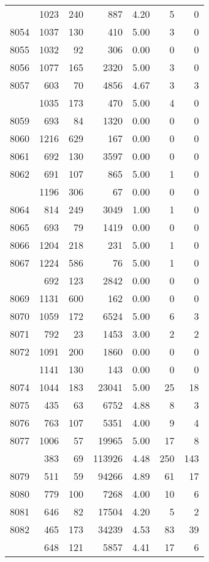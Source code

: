 \documentclass[
]{article}
\begin{document}
\begin{table}
\begin{tabular}[t]{lrrrrrr}
\addlinespace
8053 & 1023 & 240 & 887 & 4.20 & 5 & 0\\
8054 & 1037 & 130 & 410 & 5.00 & 3 & 0\\
8055 & 1032 & 92 & 306 & 0.00 & 0 & 0\\
8056 & 1077 & 165 & 2320 & 5.00 & 3 & 0\\
8057 & 603 & 70 & 4856 & 4.67 & 3 & 3\\
\addlinespace
8058 & 1035 & 173 & 470 & 5.00 & 4 & 0\\
8059 & 693 & 84 & 1320 & 0.00 & 0 & 0\\
8060 & 1216 & 629 & 167 & 0.00 & 0 & 0\\
8061 & 692 & 130 & 3597 & 0.00 & 0 & 0\\
8062 & 691 & 107 & 865 & 5.00 & 1 & 0\\
\addlinespace
8063 & 1196 & 306 & 67 & 0.00 & 0 & 0\\
8064 & 814 & 249 & 3049 & 1.00 & 1 & 0\\
8065 & 693 & 79 & 1419 & 0.00 & 0 & 0\\
8066 & 1204 & 218 & 231 & 5.00 & 1 & 0\\
8067 & 1224 & 586 & 76 & 5.00 & 1 & 0\\
\addlinespace
8068 & 692 & 123 & 2842 & 0.00 & 0 & 0\\
8069 & 1131 & 600 & 162 & 0.00 & 0 & 0\\
8070 & 1059 & 172 & 6524 & 5.00 & 6 & 3\\
8071 & 792 & 23 & 1453 & 3.00 & 2 & 2\\
8072 & 1091 & 200 & 1860 & 0.00 & 0 & 0\\
\addlinespace
8073 & 1141 & 130 & 143 & 0.00 & 0 & 0\\
8074 & 1044 & 183 & 23041 & 5.00 & 25 & 18\\
8075 & 435 & 63 & 6752 & 4.88 & 8 & 3\\
8076 & 763 & 107 & 5351 & 4.00 & 9 & 4\\
8077 & 1006 & 57 & 19965 & 5.00 & 17 & 8\\
\addlinespace
8078 & 383 & 69 & 113926 & 4.48 & 250 & 143\\
8079 & 511 & 59 & 94266 & 4.89 & 61 & 17\\
8080 & 779 & 100 & 7268 & 4.00 & 10 & 6\\
8081 & 646 & 82 & 17504 & 4.20 & 5 & 2\\
8082 & 465 & 173 & 34239 & 4.53 & 83 & 39\\
\addlinespace
8083 & 648 & 121 & 5857 & 4.41 & 17 & 6\\

\end{tabular}
\end{table}
\end{document}
